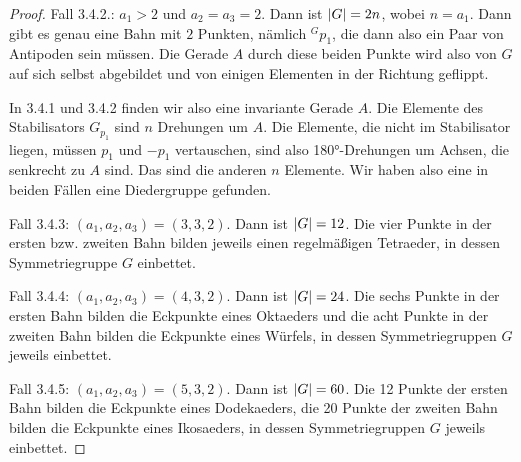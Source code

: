 \begin{proof}
Fall 3.4.2.: $a_1>2$ und $a_2=a_3=2$. Dann ist $\lvert G\rvert=2n$, wobei $n=a_1$. Dann gibt es genau eine Bahn mit $2$ Punkten, nämlich ${^Gp_1}$, die dann also ein Paar von Antipoden sein müssen. Die Gerade $A$ durch diese beiden Punkte wird also von $G$ auf sich selbst abgebildet und von einigen Elementen in der Richtung geflippt.

In 3.4.1 und 3.4.2 finden wir also eine invariante Gerade $A$. Die Elemente des Stabilisators $G_{p_1}$ sind $n$ Drehungen um $A$. Die Elemente, die nicht im Stabilisator liegen, müssen $p_1$ und $-p_1$ vertauschen, sind also 180°-Drehungen um Achsen, die senkrecht zu $A$ sind. Das sind die anderen $n$ Elemente. Wir haben also eine in beiden Fällen eine Diedergruppe gefunden.

Fall 3.4.3: $(a_1,a_2,a_3)=(3,3,2)$. Dann ist $\lvert G\rvert=12$. Die vier Punkte in der ersten bzw. zweiten Bahn bilden jeweils einen regelmäßigen Tetraeder, in dessen Symmetriegruppe $G$ einbettet.

Fall 3.4.4: $(a_1,a_2,a_3)=(4,3,2)$. Dann ist $\lvert G\rvert=24$. Die sechs Punkte in der ersten Bahn bilden die Eckpunkte eines Oktaeders und die acht Punkte in der zweiten Bahn bilden die Eckpunkte eines Würfels, in dessen Symmetriegruppen $G$ jeweils einbettet.

Fall 3.4.5: $(a_1,a_2,a_3)=(5,3,2)$. Dann ist $\lvert G\rvert=60$. Die 12 Punkte der ersten Bahn bilden die Eckpunkte eines Dodekaeders, die 20 Punkte der zweiten Bahn bilden die Eckpunkte eines Ikosaeders, in dessen Symmetriegruppen $G$ jeweils einbettet.
\end{proof}
